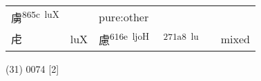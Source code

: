 \documentclass[14pt,a4paper]{scrartcl}
\begin{document}
\begin{longtable}[c]{@{}llllll@{}}
\begin{minipage}[t]{0.14\columnwidth}
虜\textsuperscript{865c~luX}
\strut\end{minipage} &
\begin{minipage}[t]{0.14\columnwidth}\raggedright\strut
\strut\end{minipage} &
\begin{minipage}[t]{0.14\columnwidth}\raggedright\strut
pure:other
\strut\end{minipage}\tabularnewline
\begin{minipage}[t]{0.14\columnwidth}\raggedright\strut
虍
\strut\end{minipage} &
\begin{minipage}[t]{0.14\columnwidth}\raggedright\strut
luX
\strut\end{minipage} &
\begin{minipage}[t]{0.14\columnwidth}\raggedright\strut
慮\textsuperscript{616e~ljoH}
\strut\end{minipage} &
\begin{minipage}[t]{0.14\columnwidth}\raggedright\strut
𧆨\textsuperscript{271a8~lu}
\strut\end{minipage} &
\begin{minipage}[t]{0.14\columnwidth}\raggedright\strut
\strut\end{minipage} &
\begin{minipage}[t]{0.14\columnwidth}\raggedright\strut
mixed
\strut\end{minipage}\tabularnewline
\bottomrule
\end{longtable}

(31) 0074 {[}2{]}
\end{document}
